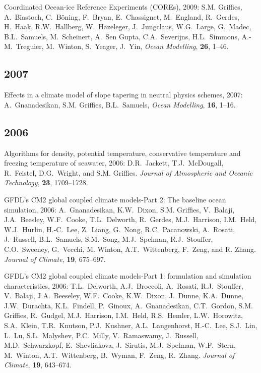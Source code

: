 \begin{etaremune}
\item Coordinated Ocean-ice Reference Experiments (COREs), 2009: S.M. Grif\/f\/ies, A.\ Biastoch, C.\ B\"{o}ning, F.\ Bryan, E.\
  Chassignet, M.\ England, R.\ Gerdes, H.\ Haak, R.W.\ Hallberg, W.\  Hazeleger, J.\ Jungclaus, W.G.\ Large, G.\ Madec, B.L.\ Samuels, M.\  Scheinert, A.\ Sen Gupta, C.A.\ Severijns, H.L.\ Simmons, A.-M.\  Treguier, M.\ Winton, S.\ Yeager, J.\ Yin,  {\em Ocean Modelling},  {\bf 26}, 1--46.  

\subsection*{\sc \color{Maroon} 2007}

\item Effects in a climate model of slope tapering in neutral physics schemes, 2007: A.\ Gnanadesikan, S.M. Grif\/f\/ies, B.L.\ Samuels, {\em Ocean Modelling}, {\bf 16}, 1--16.
  
\subsection*{\sc \color{Maroon} 2006}

\item Algorithms for density, potential temperature, conservative temperature and freezing temperature of seawater, 2006: D.R.\  Jackett, T.J.\ McDougall, R.\ Feistel, D.G.\ Wright, and S.M. Grif\/f\/ies.  {\em Journal of Atmospheric and Oceanic Technology}, {\bf 23}, 1709--1728.

\item GFDL's CM2 global coupled climate models-Part 2: The baseline ocean simulation, 2006: A.\ Gnanadesikan, K.W.\ Dixon, S.M. Grif\/f\/ies, V.\ Balaji, J.A.\ Beesley, W.F.\ Cooke, T.L.\ Delworth,  R.\ Gerdes, M.J.\ Harrison, I.M.\ Held, W.J.\ Hurlin, H.-C.\ Lee,
  Z.\ Liang, G.\ Nong, R.C.\ Pacanowski, A.\ Rosati, J.\ Russell,  B.L.\ Samuels, S.M.\ Song, M.J.\ Spelman, R.J.\ Stouffer, C.O.\  Sweeney, G.\ Vecchi, M. Winton, A.T.\ Wittenberg, F.\ Zeng, and  R. Zhang.  {\em Journal of Climate}, {\bf 19}, 675--697.

\item GFDL's CM2 global coupled climate models-Part 1: formulation and  simulation characteristics, 2006: T.L.\ Delworth, A.J.\ Broccoli,  A.\ Rosati, R.J.\ Stouffer, V.\ Balaji, J.A.\ Beeseley, W.F.\ Cooke,  K.W.\ Dixon, J.\ Dunne, K.A.\ Dunne, J.W.\ Durachta, K.L.\ Findell,
  P.\ Ginoux, A.\ Gnanadesikan, C.T.\ Gordon, 
  S.M. Grif\/f\/ies,  R.\ Gudgel, M.J.\ Harrison, I.M.\ Held, R.S.\ Hemler, L.W.\  Horowitz, S.A.\ Klein, T.R.\ Knutson, P.J.\ Kushner, A.L.\  Langenhorst, H.-C.\ Lee, S.J.\ Lin, L.\ Lu, S.L.\ Malyshev, P.C.\
  Milly, V.\ Ramaswamy, J.\ Russell, M.D.\ Schwarzkopf, E.\  Shevliakova, J.\ Sirutis, M.J.\ Spelman, W.F.\ Stern, M.\ Winton,  A.T.\ Wittenberg, B.\ Wyman, F.\ Zeng, R.\ Zhang.  {\em Journal of  Climate}, {\bf 19}, 643--674.


\end{etaremune}
